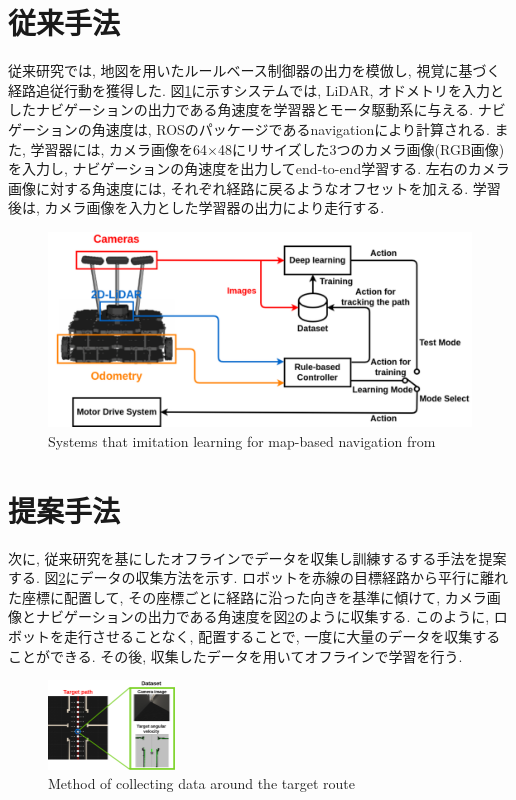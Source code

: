 \documentclass[10pt]{ujarticle}
\begin{document}
    \section{従来手法}%
    従来研究では, 地図を用いたルールベース制御器の出力を模倣し, 視覚に基づく経路追従行動を獲得した. 図\ref{Fig:si2020-okada}に示すシステムでは, LiDAR, オドメトリを入力としたナビゲーションの出力である角速度を学習器とモータ駆動系に与える. ナビゲーションの角速度は, ROSのパッケージであるnavigation\cite{navigation}により計算される. また, 学習器には, カメラ画像を64×48にリサイズした3つのカメラ画像(RGB画像)を入力し, ナビゲーションの角速度を出力してend-to-end学習する. 左右のカメラ画像に対する角速度には, それぞれ経路に戻るようなオフセットを加える. 学習後は, カメラ画像を入力とした学習器の出力により走行する. 

    \begin{figure}[h]
        \centering
        \includegraphics[keepaspectratio, scale=0.3]{fig/okada.pdf}
        \caption{Systems that imitation learning for map-based navigation from\cite{si2020-okada}}
        \label{Fig:si2020-okada}
    \end{figure}

    \section{提案手法}%
    次に, 従来研究を基にしたオフラインでデータを収集し訓練するする手法を提案する. 図\ref{Fig:collect}にデータの収集方法を示す. ロボットを赤線の目標経路から平行に離れた座標に配置して, その座標ごとに経路に沿った向きを基準に傾けて, カメラ画像とナビゲーションの出力である角速度を図\ref{Fig:collect}のように収集する. このように, ロボットを走行させることなく, 配置することで, 一度に大量のデータを収集することができる. その後, 収集したデータを用いてオフラインで学習を行う. 

    \begin{figure}[h]
        \centering
        \includegraphics[width=0.3\textwidth]{fig/collect-data2.png}
        \caption{Method of collecting data around the target route}
        \label{Fig:collect}
    \end{figure}
\end{document}
